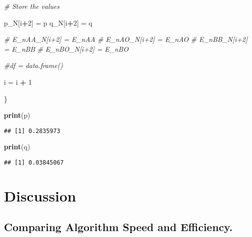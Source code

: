 \documentclass[]{article}
\newenvironment{Shaded}{\begin{snugshade}}{\end{snugshade}}
\newcommand{\KeywordTok}[1]{\textcolor[rgb]{0.13,0.29,0.53}{\textbf{#1}}}
\newcommand{\DecValTok}[1]{\textcolor[rgb]{0.00,0.00,0.81}{#1}}
\newcommand{\StringTok}[1]{\textcolor[rgb]{0.31,0.60,0.02}{#1}}
\newcommand{\CommentTok}[1]{\textcolor[rgb]{0.56,0.35,0.01}{\textit{#1}}}
\newcommand{\OperatorTok}[1]{\textcolor[rgb]{0.81,0.36,0.00}{\textbf{#1}}}
\newcommand{\NormalTok}[1]{#1}
\begin{document}
\begin{Shaded}
\begin{Highlighting}[]
        \CommentTok{# Store the values}
        
\NormalTok{        p_N[i}\OperatorTok{+}\DecValTok{2}\NormalTok{] =}\StringTok{ }\NormalTok{p}
\NormalTok{        q_N[i}\OperatorTok{+}\DecValTok{2}\NormalTok{] =}\StringTok{ }\NormalTok{q}
        
        \CommentTok{# E_nAA_N[i+2] = E_nAA}
        \CommentTok{# E_nAO_N[i+2] = E_nAO}
        \CommentTok{# E_nBB_N[i+2] = E_nBB}
        \CommentTok{# E_nBO_N[i+2] = E_nBO}
        
        \CommentTok{#df = data.frame()}
        
\NormalTok{        i =}\StringTok{ }\NormalTok{i }\OperatorTok{+}\StringTok{ }\DecValTok{1}
  
\NormalTok{\}}


\KeywordTok{print}\NormalTok{(p)}
\end{Highlighting}
\end{Shaded}

\begin{verbatim}
## [1] 0.2835973
\end{verbatim}

\begin{Shaded}
\begin{Highlighting}[]
\KeywordTok{print}\NormalTok{(q)}
\end{Highlighting}
\end{Shaded}

\begin{verbatim}
## [1] 0.03845067
\end{verbatim}

\section{Discussion}\label{discussion}

\subsection{Comparing Algorithm Speed and
Efficiency.}\label{comparing-algorithm-speed-and-efficiency.}

\subsection{}\label{section}
\end{document}
